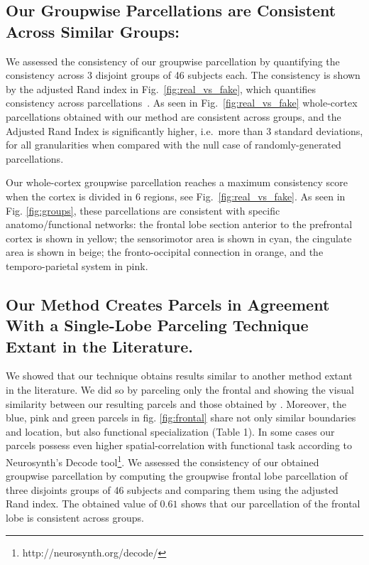 \subsection{Our Groupwise Parcellations are Consistent Across Similar Groups:}
%
We assessed the consistency of our groupwise parcellation by quantifying the
consistency across 3 disjoint groups of 46 subjects each. The consistency is
shown by the adjusted
Rand index in Fig.~\ref{fig:real_vs_fake}, which quantifies consistency across
parcellations~\citep{Hubert1985}. As seen in Fig.~\ref{fig:real_vs_fake} whole-cortex
parcellations obtained with our method are consistent across groups, and the
Adjusted Rand Index is significantly higher, i.e.\ more than 3 standard
deviations, for all granularities when compared with the null case of
randomly-generated parcellations. 

Our whole-cortex groupwise parcellation reaches a maximum consistency score when
the cortex is divided in 6 regions, see Fig.~\ref{fig:real_vs_fake}.  As seen in
Fig. \ref{fig:groups}, these parcellations are consistent with specific
anatomo/functional networks: the frontal lobe section anterior to the prefrontal
cortex is shown in yellow; the sensorimotor area is shown in cyan, the cingulate
area is shown in beige; the fronto-occipital connection in orange, and the
temporo-parietal system in pink. 

\subsection{Our Method Creates Parcels in Agreement With a Single-Lobe Parceling
            Technique Extant in the Literature.}
%
We showed that our technique obtains results similar to another method extant
in the literature. We did so by parceling only the frontal and showing the visual
similarity between our resulting parcels and those obtained by
\citet{ThiebautdeSchotten2016}. Moreover, the blue, pink and green parcels
in fig. \ref{fig:frontal} share not only similar boundaries and location, but
also functional specialization (Table 1). In some cases our parcels possess even higher
spatial-correlation with functional task according to
Neurosynth's \citep{Yarkoni2011} Decode tool\footnote{http://neurosynth.org/decode/}. We assessed the 
consistency of our obtained groupwise parcellation by computing the groupwise 
frontal lobe parcellation of three disjoints groups of 46 subjects and comparing
them using the adjusted Rand index. The obtained value of $0.61$ shows that our
parcellation of the frontal lobe is consistent across groups.
%
